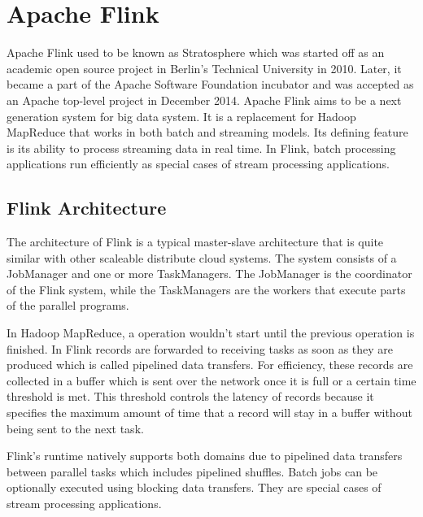 \section{Apache Flink}
Apache Flink used to be known as Stratosphere which was started off as an academic open source project in Berlin's Technical University in 2010. Later, it became a part of the Apache Software Foundation incubator and was accepted as an Apache top-level project in December 2014. Apache Flink aims to be a next generation system for big data system. It is a replacement for Hadoop MapReduce that works in both batch and streaming models. Its defining feature is its ability to process streaming data in real time. In Flink, batch processing applications run efficiently as special cases of stream processing applications.

\subsection{Flink Architecture}
The architecture of Flink is a typical master-slave architecture that is quite similar with other scaleable distribute cloud systems. The system consists of a JobManager and one or more TaskManagers. The JobManager is the coordinator of the Flink system, while the TaskManagers are the workers that execute parts of the parallel programs. 

In Hadoop MapReduce, a operation wouldn't start until the previous operation is finished. In Flink records are forwarded to receiving tasks as soon as they are produced which is called pipelined data transfers. For efficiency, these records are collected in a buffer which is sent over the network once it is full or a certain time threshold is met. This threshold controls the latency of records because it specifies the maximum amount of time that a record will stay in a buffer without being sent to the next task. 

Flink's runtime natively supports both domains due to pipelined data transfers between parallel tasks which includes pipelined shuffles. Batch jobs can be optionally executed using blocking data transfers. They are special cases of stream processing applications.


